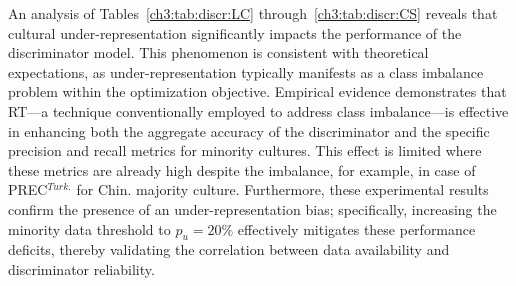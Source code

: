%
An analysis of Tables~\ref{ch3:tab:discr:LC} through~\ref{ch3:tab:discr:CS} reveals that cultural under-representation significantly impacts the performance of the discriminator model. 
This phenomenon is consistent with theoretical expectations, as under-representation typically manifests as a class imbalance problem within the optimization objective.
Empirical evidence demonstrates that RT—a technique conventionally employed to address class imbalance—is effective in enhancing both the aggregate accuracy of the discriminator and the specific precision and recall metrics for minority cultures.
This effect is limited where these metrics are already high despite the imbalance, for example, in case of PREC$^{Turk.}$ for Chin. majority culture. 
Furthermore, these experimental results confirm the presence of an under-representation bias; specifically, increasing the minority data threshold to $p_u = 20\%$ effectively mitigates these performance deficits, thereby validating the correlation between data availability and discriminator reliability.

